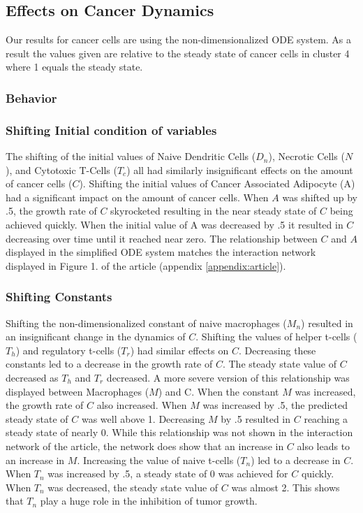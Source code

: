 \documentclass{article}
\begin{document}
\subsection{Effects on Cancer Dynamics}
Our results for cancer cells are using the non-dimensionalized ODE system. As a result the values given are relative to the steady state of cancer cells in cluster 4 where 1 equals the steady state. 

\subsubsection{Behavior}
\subsubsection{Shifting Initial condition of variables}
The shifting of the initial values of Naive Dendritic Cells ($D_n$), Necrotic Cells ($N$), and Cytotoxic T-Cells ($T_c$) all had similarly insignificant effects on the amount of cancer cells ($C$). Shifting the initial values of Cancer Associated Adipocyte (A) had a significant impact on the amount of cancer cells. When $A$ was shifted up by .5, the growth rate of $C$ skyrocketed resulting in the near steady state of $C$ being achieved quickly. When the initial value of A was decreased by .5 it resulted in $C$ decreasing over time until it reached near zero. The relationship between $C$ and $A$ displayed in the simplified ODE system matches the interaction network displayed in Figure 1. of the article (appendix \ref{appendix:article}). 
\subsubsection{Shifting Constants}
Shifting the non-dimensionalized constant of naive macrophages ($M_n$) resulted in an insignificant change in the dynamics of  $C$. 
Shifting the values of helper t-cells ($T_h$) and regulatory t-cells ($T_r$) had similar effects on $C$. Decreasing these constants led to a decrease in the growth rate of $C$. The steady state value of $C$ decreased as  $T_h$ and $T_r$ decreased.  A more severe version of this relationship was displayed between Macrophages ($M$) and C. When the constant $M$ was increased, the growth rate of $C$ also increased. When $M$ was increased by .5, the predicted steady state of $C$ was well above 1. Decreasing $M$ by .5 resulted in $C$ reaching a steady state of nearly 0. While this relationship was not shown in the interaction network of the article, the network does show that an increase in $C$ also leads to an increase in $M$. 
Increasing the value of naive t-cells ($T_n$) led to a decrease in $C$. When $T_n$ was increased by .5, a steady state of 0 was achieved for $C$ quickly. When $T_n$ was decreased, the steady state value of $C$ was almost 2. This shows that $T_n$ play a huge role in the inhibition of tumor growth. 
\end{document}
